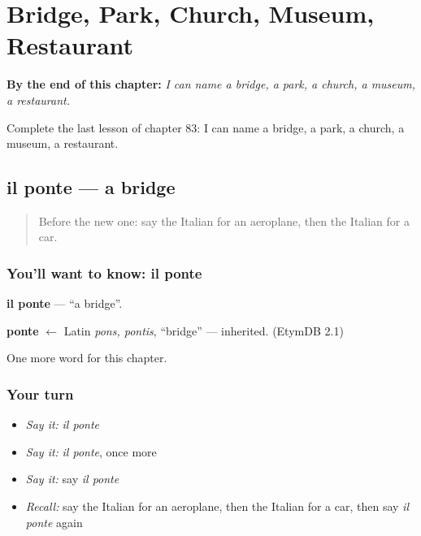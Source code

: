 
\chapter{Bridge, Park, Church, Museum, Restaurant}
\label{ch:it-bridge-park-church-museum-restaurant}

\begin{chapteropening}
\textbf{By the end of this chapter:} \emph{I can name a bridge, a park, a church, a museum, a restaurant.}

Complete the last lesson of chapter 83: I can name a bridge, a park, a church, a museum, a restaurant.
\end{chapteropening}

\section[il ponte]{il ponte — a bridge}

\label{lesson:IT-C83-ponte}



\begin{quote}
Before the new one: say the Italian for an aeroplane, then the Italian for a car.
\end{quote}

\subsection*{You'll want to know: il ponte}
\textbf{il ponte} — \textquotedblleft{}a bridge\textquotedblright{}.

\begin{cousinweb}
\textbf{ponte} $\leftarrow$ Latin \emph{pons, pontis}, \textquotedblleft{}bridge\textquotedblright{} — inherited. (EtymDB 2.1)
\end{cousinweb}

\begin{grammarlens}[title={What you've built}]
One more word for this chapter.
\end{grammarlens}

\subsection*{Your turn}
\begin{itemize}
\raggedright
  \item \emph{Say it:} \emph{il ponte}
  \item \emph{Say it:} \emph{il ponte}, once more
  \item \emph{Say it:} say \emph{il ponte}
  \item \emph{Recall:} say the Italian for an aeroplane, then the Italian for a car, then say \emph{il ponte} again
\end{itemize}

